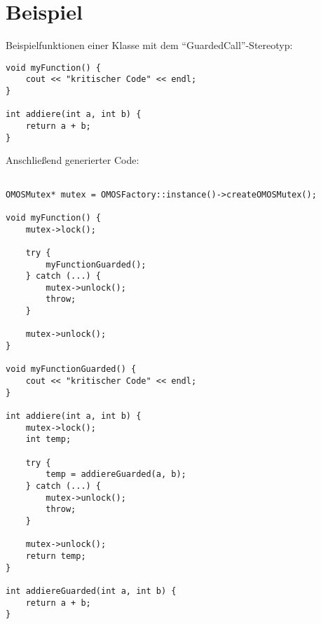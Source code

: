 \section{Beispiel}

Beispielfunktionen einer Klasse mit dem \enquote{GuardedCall}-Stereotyp:

\begin{lstlisting}
void myFunction() {
	cout << "kritischer Code" << endl;
}

int addiere(int a, int b) {
	return a + b;
}
\end{lstlisting}

Anschließend generierter Code:

 \begin{lstlisting}

OMOSMutex* mutex = OMOSFactory::instance()->createOMOSMutex();

void myFunction() {
	mutex->lock();

	try {
		myFunctionGuarded();
	} catch (...) {
		mutex->unlock();
		throw;
	}

	mutex->unlock();
}

void myFunctionGuarded() {
	cout << "kritischer Code" << endl;
}

int addiere(int a, int b) {
	mutex->lock();
	int temp;

	try {
		temp = addiereGuarded(a, b);
	} catch (...) {
		mutex->unlock();
		throw;
	}

	mutex->unlock();
	return temp;
}

int addiereGuarded(int a, int b) {
	return a + b;
}

\end{lstlisting}